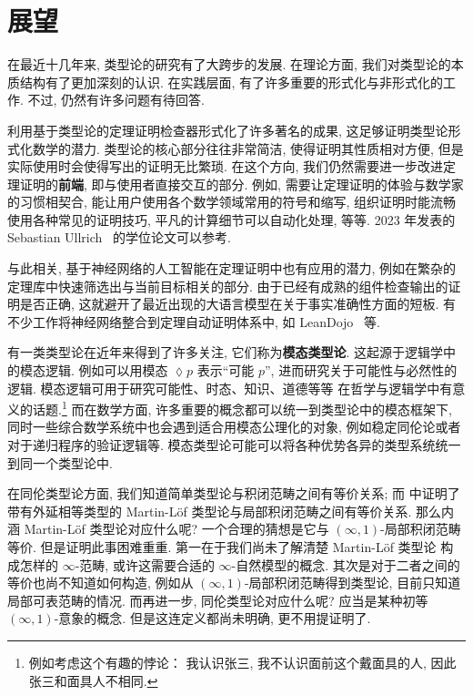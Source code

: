 \chapter{展望}
在最近十几年来, 类型论的研究有了大跨步的发展.
在理论方面, 我们对类型论的本质结构有了更加深刻的认识.
在实践层面, 有了许多重要的形式化与非形式化的工作.
不过, 仍然有许多问题有待回答.

利用基于类型论的定理证明检查器形式化了许多著名的成果,
这足够证明类型论形式化数学的潜力.
类型论的核心部分往往非常简洁, 使得证明其性质相对方便,
但是实际使用时会使得写出的证明无比繁琐.
在这个方向, 我们仍然需要进一步改进定理证明的\textbf{前端},
即与使用者直接交互的部分.
例如, 需要让定理证明的体验与数学家的习惯相契合,
能让用户使用各个数学领域常用的符号和缩写,
组织证明时能流畅使用各种常见的证明技巧,
平凡的计算细节可以自动化处理, 等等.
2023 年发表的 Sebastian Ullrich~\cite{ullrich:2023:frontend} 的学位论文可以参考.

与此相关, 基于神经网络的人工智能在定理证明中也有应用的潜力,
例如在繁杂的定理库中快速筛选出与当前目标相关的部分.
由于已经有成熟的组件检查输出的证明是否正确,
这就避开了最近出现的大语言模型在关于事实准确性方面的短板.
有不少工作将神经网络整合到定理自动证明体系中,
如 LeanDojo~\cite{yang:2023:leandojo} 等.

有一类类型论在近年来得到了许多关注, 它们称为\textbf{模态类型论}.
这起源于逻辑学中的模态逻辑.
例如可以用模态 \(\lozenge p\) 表示“可能 \(p\)”,
进而研究关于可能性与必然性的逻辑.
模态逻辑可用于研究可能性、时态、知识、道德等等
在哲学与逻辑学中有意义的话题.\footnote{例如考虑这个有趣的悖论：
我认识张三, 我不认识面前这个戴面具的人, 因此张三和面具人不相同.}
而在数学方面, 许多重要的概念都可以统一到类型论中的模态框架下,
同时一些综合数学系统中也会遇到适合用模态公理化的对象,
例如稳定同伦论或者对于递归程序的验证逻辑等.
模态类型论可能可以将各种优势各异的类型系统统一到同一个类型论中.

在同伦类型论方面, 我们知道简单类型论与积闭范畴之间有等价关系;
而 \cite{clairambault:2014:biequivalence} 中证明了
带有外延相等类型的 Martin-L\"of 类型论与局部积闭范畴之间有等价关系.
那么内涵 Martin-L\"of 类型论对应什么呢?
一个合理的猜想是它与 \((\infty, 1)\)-局部积闭范畴等价.
但是证明此事困难重重. 第一在于我们尚未了解清楚 Martin-L\"of 类型论
构成怎样的 \(\infty\)-范畴, 或许这需要合适的 \(\infty\)-自然模型的概念.
其次是对于二者之间的等价也尚不知道如何构造,
例如从 \((\infty, 1)\)-局部积闭范畴得到类型论,
目前只知道局部可表范畴的情况.
而再进一步, 同伦类型论对应什么呢?
应当是某种初等 \((\infty, 1)\)-意象的概念.
但是这连定义都尚未明确, 更不用提证明了.


